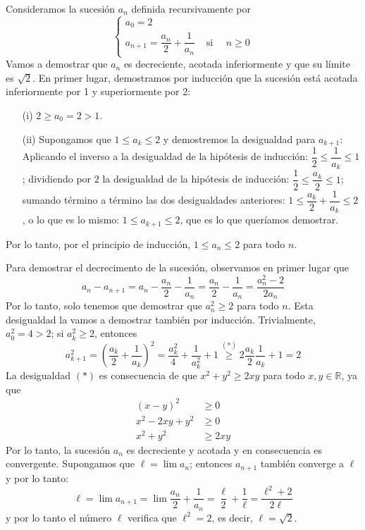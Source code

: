 \begin{ejemplo}\label{ej:raiz2}
Consideramos la sucesión $a_n$ definida recursivamente por
\[
\begin{cases}
a_0=2\\
a_{n+1}=\dfrac{a_n}{2}+\dfrac{1}{a_n} & \text{ si }\quad n\ge 0
\end{cases}
\]
Vamos a demostrar que $a_n$ es decreciente, acotada inferiormente y que su límite es $\sqrt2$.
En primer lugar, demostramos por inducción que la sucesión está acotada inferiormente por 1 y superiormente por 2:
\begin{itemize}
\item[(i)]
$2\ge a_0=2>1$.
\item[(ii)]
Supongamos que $1\le a_k\le2$ y demostremos la desigualdad para $a_{k+1}$:\newline
Aplicando el inverso a la desigualdad de la hipótesis de inducción:
$\dfrac12\le \dfrac1{a_k}\le 1$;\newline
dividiendo por 2 la desigualdad de la hipótesis de inducción:
$\dfrac12\le \dfrac{a_k}2 \le 1$;\newline
sumando término a término las dos desigualdades anteriores:
$1\le \dfrac{a_k}{2}+\dfrac{1}{a_k} \le 2$,\newline
o lo que es lo mismo: $1\le a_{k+1} \le 2$, que es lo que queríamos demostrar.
\end{itemize}
Por lo tanto, por el principio de inducción, $1\le a_n\le 2$ para todo $n$.

Para demostrar el decrecimento de la sucesión, observamos en primer lugar que
\[
a_n-a_{n+1} = a_n-\dfrac{a_n}{2}-\dfrac{1}{a_n} =
\dfrac{a_n}{2}-\dfrac{1}{a_n} =\dfrac{a_n^2-2}{2a_n}
\]
Por lo tanto, solo tenemos que demostrar que $a_n^2\ge 2$ para todo $n$. Esta desigualdad la vamos a demostrar también por inducción.\newline
Trivialmente, $a_0^2=4>2$;
si $a_k^2\ge 2$, entonces
\[
a_{k+1}^2 = \left(\dfrac{a_k}{2}+\dfrac{1}{a_k}\right)^2 =
\dfrac{a_k^2}{4}+\dfrac{1}{a_k^2}+1
\stackrel{(\ast)}{\ge} 2\dfrac{a_{k}}{2}\dfrac{1}{a_{k}} + 1 = 2
\]
La desigualdad $(\ast)$ es consecuencia de que $x^2+y^2\ge 2xy$ para todo $x,y\in\mathbb{R}$, ya que
\begin{align*}
(x-y)^2 & \ge 0\\
x^2-2xy+y^2 &\ge 0\\
x^2+y^2 &\ge 2xy
\end{align*}
Por lo tanto, la sucesión $a_n$ es decreciente y acotada y en consecuencia es convergente. Supongamos que $\ell=\lim a_n$; entonces $a_{n+1}$ también converge a $\ell$ y por lo tanto:
\[
\ell = \lim a_{n+1}= \lim \dfrac{a_n}{2}+\dfrac{1}{a_n} = \dfrac\ell2+\dfrac1\ell =\dfrac{\ell^2+2}{2\ell}
\]
y por lo tanto el número $\ell$ verifica que $\ell^2=2$, es decir, $\ell=\sqrt2$.\fej
\end{ejemplo}



